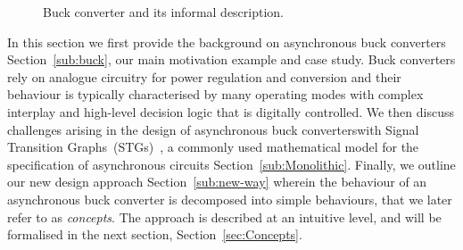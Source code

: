 \documentclass[british, journal]{IEEEtran}
\begin{document}
\begin{figure}[t]
\begin{centering}
\par
{}
\par
\end{centering}
\protect\caption{\label{fig:buck}Buck converter and its informal description.}
\vspace{-3mm}
\end{figure}

In this section we first provide the background on asynchronous buck
converters Section~\ref{sub:buck}, our main motivation example and case study.
Buck converters rely on analogue circuitry for power regulation and
conversion and their behaviour is typically characterised by many operating
modes with complex interplay and high-level decision logic that is digitally
controlled.
We then discuss challenges arising in the design of asynchronous buck converterswith Signal Transition
Graphs~(STGs)~\cite{Chu_1987_phd}\cite{Rosenblum_1985_tpn},
a commonly used mathematical model for the specification of asynchronous
circuits Section~\ref{sub:Monolithic}.
Finally, we outline our new design approach Section~\ref{sub:new-way} wherein
the
behaviour of an asynchronous buck converter is decomposed into simple
behaviours, that we later refer to as \emph{concepts}. The approach is
described at an intuitive level, and will be formalised in the next
section, Section~\ref{sec:Concepts}.
\end{document}
